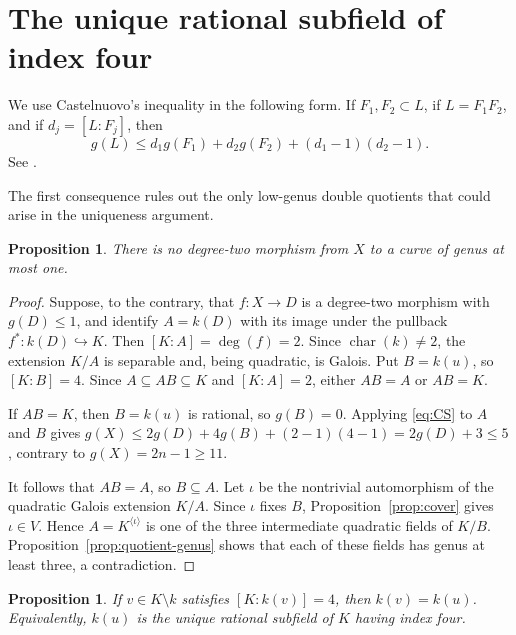 \documentclass[11pt,reqno]{amsart}
\newtheorem{proposition}[theorem]{Proposition}
\theoremstyle{remark}
\begin{document}
\section{The unique rational subfield of index four}

We use Castelnuovo's inequality in the following form. If $F_1,F_2\subset L$, if $L=F_1F_2$, and if $d_j=[L:F_j]$, then
\begin{equation}\label{eq:CS}
  g(L)\leq d_1g(F_1)+d_2g(F_2)+(d_1-1)(d_2-1).
\end{equation}
See \cite[Theorem~3.11.3]{Stichtenoth}.

The first consequence rules out the only low-genus double quotients that could arise in the uniqueness argument.

\begin{proposition}\label{prop:no-low-genus}
There is no degree-two morphism from $X$ to a curve of genus at most one.
\end{proposition}

\begin{proof}
Suppose, to the contrary, that $f:X\to D$ is a degree-two morphism with $g(D)\leq1$, and identify $A=k(D)$ with its image under the pullback $f^*:k(D)\hookrightarrow K$. Then $[K:A]=\deg(f)=2$. Since $\operatorname{char}(k)\ne2$, the extension $K/A$ is separable and, being quadratic, is Galois. Put $B=k(u)$, so $[K:B]=4$. Since $A\subseteq AB\subseteq K$ and $[K:A]=2$, either $AB=A$ or $AB=K$.

If $AB=K$, then $B=k(u)$ is rational, so $g(B)=0$. Applying \eqref{eq:CS} to $A$ and $B$ gives $g(X)\leq2g(D)+4g(B)+(2-1)(4-1)=2g(D)+3\leq5$, contrary to $g(X)=2n-1\geq11$.

It follows that $AB=A$, so $B\subseteq A$. Let $\iota$ be the nontrivial automorphism of the quadratic Galois extension $K/A$. Since $\iota$ fixes $B$, Proposition~\ref{prop:cover} gives $\iota\in V$. Hence $A=K^{\langle\iota\rangle}$ is one of the three intermediate quadratic fields of $K/B$. Proposition~\ref{prop:quotient-genus} shows that each of these fields has genus at least three, a contradiction.
\end{proof}



\begin{proposition}\label{prop:unique}
If $v\in K\setminus k$ satisfies $[K:k(v)]=4$, then $k(v)=k(u)$. Equivalently, $k(u)$ is the unique rational subfield of $K$ having index four.
\end{proposition}
\end{document}
